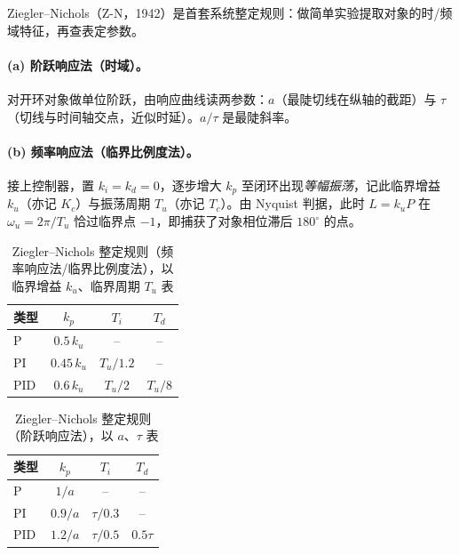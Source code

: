 Ziegler--Nichols（Z-N，1942\cite{ziegler1942optimum}）是首套系统整定规则：做简单实验提取对象的时/频域特征，再查表定参数。

\paragraph{(a) 阶跃响应法（时域）。}
对开环对象做单位阶跃，由响应曲线读两参数：$a$（最陡切线在纵轴的截距）与 $\tau$（切线与时间轴交点，近似时延）。$a/\tau$ 是最陡斜率。

\paragraph{(b) 频率响应法（临界比例度法）。}
接上控制器，置 $k_i=k_d=0$，逐步增大 $k_p$ 至闭环出现\emph{等幅振荡}，记此临界增益 $k_u$（亦记 $K_c$）与振荡周期 $T_u$（亦记 $T_c$）。由 Nyquist 判据，此时 $L=k_uP$ 在 $\omega_u=2\pi/T_u$ 恰过临界点 $-1$，即捕获了对象相位滞后 $180^\circ$ 的点。

\begin{table}[H]\centering\small
\caption{Ziegler--Nichols 整定规则（频率响应法/临界比例度法），以临界增益 $k_u$、临界周期 $T_u$ 表}
\label{tab:ctrl-zn-freq}
\begin{tabular}{lccc}
\toprule
类型 & $k_p$ & $T_i$ & $T_d$ \\
\midrule
P   & $0.5\,k_u$  & --        & --        \\
PI  & $0.45\,k_u$ & $T_u/1.2$ & --        \\
PID & $0.6\,k_u$  & $T_u/2$   & $T_u/8$   \\
\bottomrule
\end{tabular}
\end{table}

\begin{table}[H]\centering\small
\caption{Ziegler--Nichols 整定规则（阶跃响应法），以 $a$、$\tau$ 表}
\label{tab:ctrl-zn-step}
\begin{tabular}{lccc}
\toprule
类型 & $k_p$ & $T_i$ & $T_d$ \\
\midrule
P   & $1/a$   & --          & --        \\
PI  & $0.9/a$ & $\tau/0.3$  & --        \\
PID & $1.2/a$ & $\tau/0.5$  & $0.5\tau$ \\
\bottomrule
\end{tabular}
\end{table}


